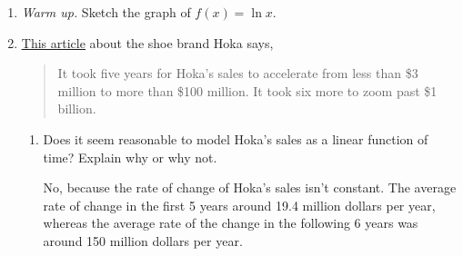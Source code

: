 \documentclass{article}
\makeatletter
\let\@href=\href
\renewcommand{\href}[2]{\@href{#1}{\ul{#2}}}
\makeatother
\begin{document}
\begin{enumerate}
\item 


  \begin{problem}[1.5in]
    \emph{Warm up.} Sketch the graph of $f(x) = \ln x$.
  \end{problem}

  \begin{solution}
    \begin{center}
    \end{center}
  \end{solution}

\item  


  \href{https://people.math.harvard.edu/~jjchen/mathma/docs/articles/hoka-shoes-running-deckers-ugly-sneakers.html}{This article} about the shoe brand Hoka says,
  \begin{quote}
    It took five years for Hoka’s sales to accelerate from less than \$3 million to more than \$100 million. It took six more to zoom past \$1 billion.
  \end{quote}

  \begin{enumerate}
  \item


    \begin{problem}[\vfill]
      Does it seem reasonable to model Hoka's sales as a linear function of time? Explain why or why not. 
    \end{problem}

    \begin{solution}
      No, because the rate of change of Hoka's sales isn't constant.
      The average rate of change in the first 5 years around
      19.4 million
      dollars per year, whereas the average rate of the change in the
      following 6 years was around 150 million dollars per year.
    \end{solution}


\end{enumerate}
\end{enumerate}
\end{document}
